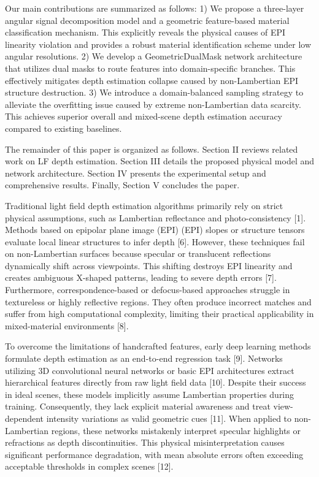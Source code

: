 Our main contributions are summarized as follows:
1) We propose a three-layer angular signal decomposition model and a geometric feature-based material classification mechanism. This explicitly reveals the physical causes of EPI linearity violation and provides a robust material identification scheme under low angular resolutions.
2) We develop a GeometricDualMask network architecture that utilizes dual masks to route features into domain-specific branches. This effectively mitigates depth estimation collapse caused by non-Lambertian EPI structure destruction.
3) We introduce a domain-balanced sampling strategy to alleviate the overfitting issue caused by extreme non-Lambertian data scarcity. This achieves superior overall and mixed-scene depth estimation accuracy compared to existing baselines.

The remainder of this paper is organized as follows. Section II reviews related work on LF depth estimation. Section III details the proposed physical model and network architecture. Section IV presents the experimental setup and comprehensive results. Finally, Section V concludes the paper.

Traditional light field depth estimation algorithms primarily rely on strict physical assumptions, such as Lambertian reflectance and photo-consistency [1]. Methods based on epipolar plane image (EPI) (EPI) slopes or structure tensors evaluate local linear structures to infer depth [6]. However, these techniques fail on non-Lambertian surfaces because specular or translucent reflections dynamically shift across viewpoints. This shifting destroys EPI linearity and creates ambiguous X-shaped patterns, leading to severe depth errors [7]. Furthermore, correspondence-based or defocus-based approaches struggle in textureless or highly reflective regions. They often produce incorrect matches and suffer from high computational complexity, limiting their practical applicability in mixed-material environments [8].

To overcome the limitations of handcrafted features, early deep learning methods formulate depth estimation as an end-to-end regression task [9]. Networks utilizing 3D convolutional neural networks or basic EPI architectures extract hierarchical features directly from raw light field data [10]. Despite their success in ideal scenes, these models implicitly assume Lambertian properties during training. Consequently, they lack explicit material awareness and treat view-dependent intensity variations as valid geometric cues [11]. When applied to non-Lambertian regions, these networks mistakenly interpret specular highlights or refractions as depth discontinuities. This physical misinterpretation causes significant performance degradation, with mean absolute errors often exceeding acceptable thresholds in complex scenes [12].

